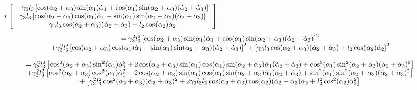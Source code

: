 \documentclass{article}
\begin{document}
$\ast \left[ 
\begin{array}{c}
-\gamma _{3}l_{3}\left[ \cos (\alpha _{2}+\alpha _{3})\sin (\alpha _{1})\dot{%
\alpha}_{1}+\cos (\alpha _{1})\sin (\alpha _{2}+\alpha _{3})(\dot{\alpha}%
_{2}+\dot{\alpha}_{3})\right]  \\ 
\gamma _{3}l_{3}\left[ \cos (\alpha _{2}+\alpha _{3})\cos (\alpha _{1})\dot{%
\alpha}_{1}-\sin (\alpha _{1})\sin (\alpha _{2}+\alpha _{3})(\dot{\alpha}%
_{2}+\dot{\alpha}_{3})\right]  \\ 
\gamma _{3}l_{3}\cos (\alpha _{2}+\alpha _{3})(\dot{\alpha}_{2}+\dot{\alpha}%
_{3})+l_{2}\cos (\alpha _{2})\dot{\alpha}_{2}%
\end{array}%
\right] $%
\[
\begin{array}{c}
=\gamma _{3}^{2}l_{3}^{2}\left[ \cos (\alpha _{2}+\alpha _{3})\sin (\alpha
_{1})\dot{\alpha}_{1}+\cos (\alpha _{1})\sin (\alpha _{2}+\alpha _{3})(\dot{%
\alpha}_{2}+\dot{\alpha}_{3})\right] ^{2} \\ 
+\gamma _{3}^{2}l_{3}^{2}\left[ \cos (\alpha _{2}+\alpha _{3})\cos (\alpha
_{1})\dot{\alpha}_{1}-\sin (\alpha _{1})\sin (\alpha _{2}+\alpha _{3})(\dot{%
\alpha}_{2}+\dot{\alpha}_{3})\right] ^{2}+\left[ \gamma _{3}l_{3}\cos
(\alpha _{2}+\alpha _{3})(\dot{\alpha}_{2}+\dot{\alpha}_{3})+l_{2}\cos
(\alpha _{2})\dot{\alpha}_{2}\right] ^{2} \\ 
\\ 
=\gamma _{3}^{2}l_{3}^{2}\left[ \cos ^{2}(\alpha _{2}+\alpha _{3})\sin
^{2}(\alpha _{1})\dot{\alpha}_{1}^{2}+2\cos (\alpha _{2}+\alpha _{3})\sin
(\alpha _{1})\cos (\alpha _{1})\sin (\alpha _{2}+\alpha _{3})\dot{\alpha}%
_{1}(\dot{\alpha}_{2}+\dot{\alpha}_{3})+\cos ^{2}(\alpha _{1})\sin
^{2}(\alpha _{2}+\alpha _{3})(\dot{\alpha}_{2}+\dot{\alpha}_{3})^{2}\right] 
\\ 
+\gamma _{3}^{2}l_{3}^{2}\left[ \cos ^{2}(\alpha _{2}+\alpha _{3})\cos
^{2}(\alpha _{1})\dot{\alpha}_{1}^{2}-2\cos (\alpha _{2}+\alpha _{3})\sin
(\alpha _{1})\cos (\alpha _{1})\sin (\alpha _{2}+\alpha _{3})\dot{\alpha}%
_{1}(\dot{\alpha}_{2}+\dot{\alpha}_{3})+\sin ^{2}(\alpha _{1})\sin
^{2}(\alpha _{2}+\alpha _{3})(\dot{\alpha}_{2}+\dot{\alpha}_{3})^{2}\right] 
\\ 
+\left[ \gamma _{3}^{2}l_{3}^{2}\cos ^{2}(\alpha _{2}+\alpha _{3})(\dot{%
\alpha}_{2}+\dot{\alpha}_{3})^{2}+2\gamma _{3}l_{3}l_{2}\cos (\alpha
_{2}+\alpha _{3})\cos (\alpha _{2})(\dot{\alpha}_{2}+\dot{\alpha}_{3})\dot{%
\alpha}_{2}+l_{2}^{2}\cos ^{2}(\alpha _{2})\dot{\alpha}_{2}^{2}\right]  \\ 
\\ 

\end{array}\]
\end{document}
